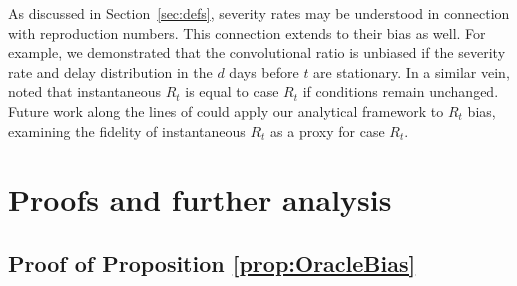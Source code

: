 \documentclass{article}
\renewcommand{\hat}{\widehat} %
\begin{document}
As discussed in Section~\ref{sec:defs}, severity rates may be understood in connection with reproduction numbers. This connection extends to their bias as well. For example, we  demonstrated that the convolutional ratio is unbiased if the severity rate and delay distribution in the $d$ days before $t$ are stationary. In a similar vein, \citet{fraser2007} noted that instantaneous $R_t$ is equal to case $R_t$ if conditions remain unchanged. 
Future work along the lines of \citet{rt_study} could apply our analytical framework to $R_t$ bias, examining the fidelity of instantaneous $R_t$ as a proxy for case $R_t$. 




\clearpage
\appendix

\section{Proofs and further analysis}
\label{apx:proofs}

\subsection{Proof of Proposition \ref{prop:OracleBias}}
\label{apx:OracleBias}
\end{document}
